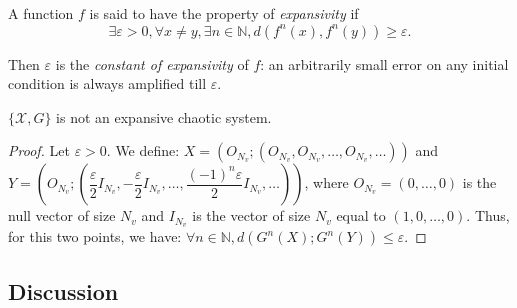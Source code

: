 \documentclass{llncs}
\begin{document}
\begin{definition}
A function $f$ is said to have the property of \emph{expansivity} if
\begin{equation*}
\exists \varepsilon >0,\forall x\neq y,\exists n\in \mathbb{N},d(f^{n}(x),f^{n}(y))\geqslant \varepsilon .
\end{equation*}
\end{definition}

Then $\varepsilon $ is the \emph{constant of expansivity} of $f$: an arbitrarily small error on any initial condition is always amplified till $\varepsilon $.



\begin{proposition}
$\{\mathcal{X},G\}$ is not an expansive chaotic system.
\end{proposition}

\begin{proof}
Let $\varepsilon > 0$. We define: $X = \left( O_{N_v} ; (O_{N_v}, O_{N_v}, \hdots, O_{N_v}, \hdots ) \right)$ and $Y = \left( O_{N_v} ; (\dfrac{\varepsilon}{2} I_{N_v}, -\dfrac{\varepsilon}{2} I_{N_v}, \hdots, \dfrac{(-1)^n \varepsilon}{2} I_{N_v}, \hdots )\right)$, where $O_{N_v} = (0, \hdots, 0)$ is the null vector of size $N_v$ and $I_{N_v}$ is the vector of size $N_v$ equal to $(1,0, \hdots, 0)$. Thus, for this two points, we have:
$\forall n \in \mathds{N}, d\left(G^n (X) ; G^n (Y) \right) \leqslant \varepsilon .$
\end{proof}



\subsection{Discussion}
\label{Discussion}
\end{document}
